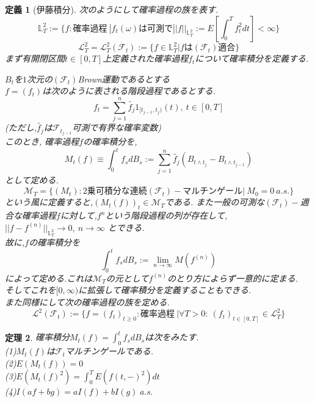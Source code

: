 \documentclass[a4paper,dvipdfmx]{jreport}
\numberwithin{equation}{section}
\newtheorem{Thm}     {定理}[section]
\newtheorem{Def}     [Thm]{定義}
\renewenvironment{leftbar}{%
  \def\FrameCommand{\vrule width 1pt \hspace{10pt}}%
  \MakeFramed {\advance\hsize-\width \FrameRestore}}%
 {\endMakeFramed}
\def\F{\mathcal F}
\def\bbL{\mathbb L}
\def\calL{\mathcal L}
\def\thm{\begin{leftbar}\begin{Thm}}
\def\thmx{\end{Thm}\end{leftbar}}
\def\defb{\begin{leftbar}\begin{Def}}
\def\defx{\end{Def}\end{leftbar}}
\begin{document}
\defb[伊藤積分]
次のようにして確率過程の族を表す.\\
\[
\bbL_T^2 := \{f:\mbox{確率過程}\  | f_t(\omega)\mbox{は可測で}||f||_{\bbL_T^2}:= E[\int_{0}^T f_t^2 dt] < \infty \}
\]
\[
\calL_T^2 = \calL_T^2 (\F_t) := \{ f \in \bbL_T^2 | f\mbox{は}(\F_t)\mbox{適合}\}
\]
まず有開閉区間$t\in [0,T]$上定義された確率過程$f_t$について確率積分を定義する.\par
$B_t$を$1$次元の$(\F_t)$Brown運動であるとする \\
$f=(f_t)$は次のように表される階段過程であるとする.\\
\[
f_t = \sum_{j=1}^n \tilde{f_j} 1_{[t_{j-1},t_j)}(t) ,\ t\in [0,T]
\]
(ただし,$\tilde{f_j}$は$\F_{t_{j-1}}$可測で有界な確率変数)\\
このとき, 確率過程$f$の確率積分を,
\[
M_t(f) \equiv \int_0^t f_s dB_s := \sum_{j=1}^n \tilde{f_j} (B_{t\wedge t_j} - B_{t\wedge t_{j-1}})
\]
として定める.
\[
\mathcal M _T = \{ (M_t) : \mbox{2乗可積分な連続}(\F_t)-\mbox{マルチンゲール} | \ M_0 = 0 \ a.s. \}
\]
という風に定義すると,$(M_t(f))_t \in \mathcal M _T$である.
また一般の可測な$(\F_t)-$適合な確率過程$f$に対して,$f^n$という階段過程の列が存在して,$||f-f^{(n)}||_{\bbL_T^2} \to 0 ,\ n\to \infty$
とできる.\\
故に,$f$の確率積分を
\[
\int_0^t f_sdB_s := \lim_{n\to\infty} M(f^{(n)})
\]
によって定める.これは$\mathcal M _T$の元として$f^{(n)}$のとり方によらず一意的に定まる.\\
そしてこれを$[0,\infty)$に拡張して確率積分を定義することもできる.\\
また同様にして次の確率過程の族を定める.\\
\[
\calL^2(\F_t) := \{f=(f_t)_{t\ge 0}:\mbox{確率過程}\  | \forall T>0 : \ (f_t)_{t\in [0,T]} \in \calL^2_T \}
\]

\defx

\thm
確率積分$M_t(f) = \int_0^t f_sdB_s$は次をみたす.\\
(1)$M_t(f)$は$\F_t$マルチンゲールである.\\
(2)$E(M_t(f))=0$\\
(3)$E(M_t(f)^2) = \int_0^T E(f(t,-)^2)dt$\\
(4)$I(af+bg) = aI(f)+bI(g)\ $a.s.\\
\thmx
\end{document}
